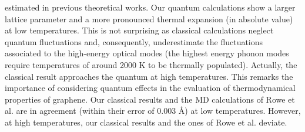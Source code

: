estimated in previous theoretical works\cite{rowe2018development,zakharchenko2009finite}. Our quantum calculations 
show a larger lattice parameter and a more pronounced thermal expansion (in absolute value) at low temperatures. This 
is not surprising as classical calculations neglect quantum fluctuations and, consequently, underestimate the 
fluctuations associated to the high-energy optical modes (the highest energy phonon modes require temperatures of 
around 2000 K to be thermally populated). Actually, the classical result approaches the quantum at high temperatures. 
This remarks the importance of considering quantum effects in the evaluation of thermodynamical properties of 
graphene. Our classical results and the MD calculations of Rowe et al.\cite{rowe2018development} are in agreement 
(within their error of $0.003$ \AA) at low temperatures. However, at high temperatures, our classical results and 
the ones of Rowe et al. deviate. \\

